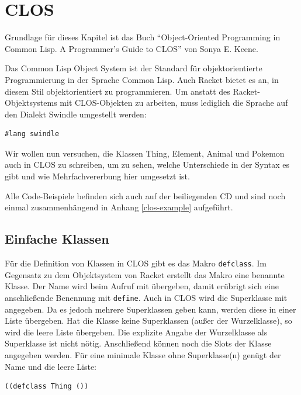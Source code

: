 \section{CLOS}
Grundlage für dieses Kapitel ist das Buch ``Object-Oriented Programming in Common Lisp. A Programmer's Guide to CLOS'' \cite{keene} von Sonya E. Keene. 

Das Common Lisp Object System ist der Standard für objektorientierte Programmierung in der Sprache Common Lisp. Auch Racket bietet es an, in diesem Stil objektorientiert zu programmieren. Um anstatt des Racket-Objektsystems mit CLOS-Objekten zu arbeiten, muss lediglich die Sprache auf den Dialekt Swindle umgestellt werden:


\begin{lstlisting}
#lang swindle
\end{lstlisting}

Wir wollen nun versuchen, die Klassen Thing, Element, Animal und Pokemon auch in CLOS zu schreiben, um zu sehen, welche Unterschiede in der Syntax es gibt und wie Mehrfachvererbung hier umgesetzt ist. 

Alle Code-Beispiele befinden sich auch auf der beiliegenden CD und sind noch einmal zusammenhängend in Anhang \ref{clos-example} aufgeführt.

\subsection{Einfache Klassen}
Für die Definition von Klassen in CLOS gibt es das Makro \texttt{defclass}. Im Gegensatz zu dem Objektsystem von Racket erstellt das Makro eine benannte Klasse. Der Name wird beim Aufruf mit übergeben, damit erübrigt sich eine anschließende Benennung mit \texttt{define}. Auch in CLOS wird die Superklasse mit angegeben. Da es jedoch mehrere Superklassen geben kann, werden diese in einer Liste übergeben. Hat die Klasse keine Superklassen (außer der Wurzelklasse), so wird die leere Liste übergeben. Die explizite Angabe der Wurzelklasse als Superklasse ist nicht nötig. Anschließend können noch die Slots der Klasse angegeben werden. Für eine minimale Klasse ohne Superklasse(n) genügt der Name und die leere Liste: 

\begin{lstlisting}
((defclass Thing ())
\end{lstlisting}


